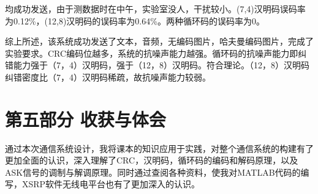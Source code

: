 \documentclass[UTF8]{ctexart}
\begin{document}
均成功发送，由于测数据时在中午，实验室没人，干扰较小。(7,4)汉明码误码率为0.12\%，(12,8)汉明码的误码率为0.64\%。两种循环码的误码率为0。

综上所述，该系统成功发送了文本，音频，无编码图片，哈夫曼编码图片，完成了实验要求。CRC编码位越多，系统的抗噪声能力越强。循环码的抗噪声能力即纠错能力强于（7，4）汉明码，强于（12，8）汉明码。符合理论。（12，8）汉明码纠错密度比（7，4）汉明码稀疏，故抗噪声能力较弱。

\newpage

\section{第五部分 \texorpdfstring{\quad}{} 收获与体会}

通过本次通信系统设计，我将课本的知识应用于实践，对整个通信系统的构建有了更加全面的认识，深入理解了CRC，汉明码，循环码的编码和解码原理，以及ASK信号的调制与解调原理。同时通过查阅各种资料，使我对MATLAB代码的编写，XSRP软件无线电平台也有了更加深入的认识。
   
\end{document}
